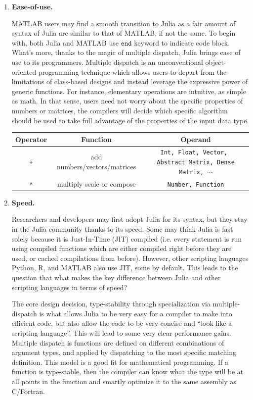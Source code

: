 \begin{enumerate}
\item {\bf Ease-of-use.} 

MATLAB users may find a smooth transition to Julia as a fair amount of syntax of Julia are similar to that of MATLAB, if not the same. To begin with, both Julia and MATLAB use $\texttt{end}$ keyword to indicate code block. What's more, thanks to the magic of multiple dispatch, Julia brings ease of use to its programmers. Multiple dispatch is an unconventional object-oriented programming technique which allows users to depart from the limitations of class-based designs and instead leverage the expressive power of generic functions. For instance, elementary operations are intuitive, as simple as math. In that sense, users need not worry about the specific properties of numbers or matrices, the compilers will decide which specific algorithm should be used to take full advantage of the properties of the input data type.

\begin{table}[H]
\centering
\begin{tabular}{|| c | c | c ||} \hline
Operator & Function & Operand \\ [0.5ex] \hline\hline
\texttt{+} & add numbers/vectors/matrices & 
\makecell{\texttt{Int, Float, Vector, }\\ 
\texttt{Abstract Matrix, Dense Matrix, $\cdots$}} \\ \hline
\texttt{*} & multiply scale or compose & \texttt{Number, Function} \\ 
\hline\hline
\end{tabular}
\label{add-mul}
\end{table}

\item {\bf Speed.}  
 
Researchers and developers may first adopt Julia for its syntax, but they stay in the Julia community thanks to its speed. Some may think Julia is fast solely because it is Just-In-Time (JIT) 
compiled (i.e. every statement is run using compiled functions 
which are either compiled right before they are used, or cached compilations 
from before). However, other scripting languages Python, R, and MATLAB 
also use JIT, some by default. This leads to the question that what makes 
the key difference between Julia and other scripting languages 
in terms of speed?

The core design decision, type-stability through specialization via multiple-dispatch is what allows Julia to be very easy for a compiler to make into efficient code, but also allow the code to be very concise and ``look like a scripting language''. This will lead to some very clear performance gains. Multiple dispatch is functions are defined on different combinations of argument types, and applied by dispatching to the most specific matching definition. This model is a good fit for mathematical programming. If a function is type-stable, then the compiler can know what the type will be at all points in the function and smartly optimize it to the same assembly as C/Fortran.

\end{enumerate} 

